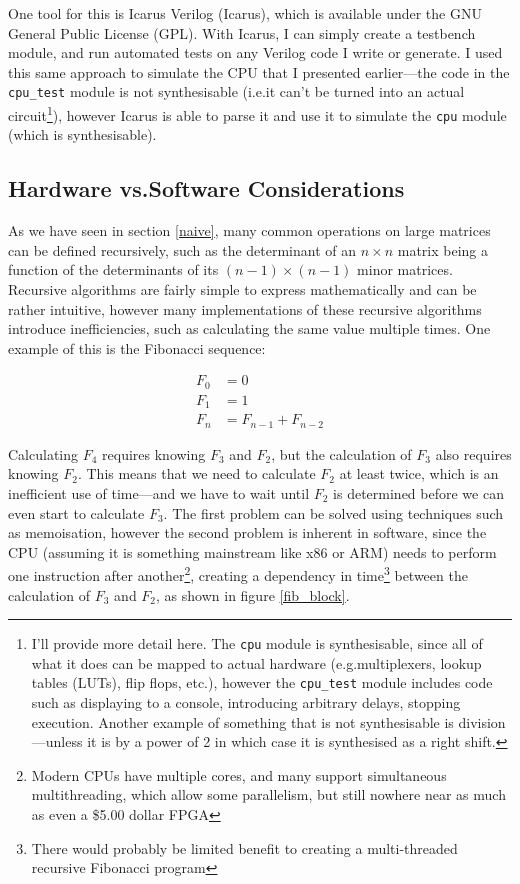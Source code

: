 \documentclass[12pt]{article}
\begin{document}
One tool for this is Icarus Verilog (Icarus), which is available under the GNU General Public License (GPL). With Icarus, I can simply create a testbench module, and run automated tests on any Verilog code I write or generate. I used this same approach to simulate the CPU that I presented earlier---the code in the \lstinline[language=Verilog]|cpu_test| module is not synthesisable (i.e.\@ it can't be turned into an actual circuit\footnote{I'll provide more detail here. The \lstinline[language=Verilog]|cpu| module is synthesisable, since all of what it does can be mapped to actual hardware (e.g.\@ multiplexers, lookup tables (LUTs), flip flops, etc.\@), however the \lstinline[language=Verilog]|cpu_test| module includes code such as displaying to a console, introducing arbitrary delays, stopping execution. Another example of something that is not synthesisable is division---unless it is by a power of 2 in which case it is synthesised as a right shift.}), however Icarus is able to parse it and use it to simulate the \lstinline[language=Verilog]|cpu| module (which is synthesisable).

\subsection{Hardware vs.\@ Software Considerations}

As we have seen in section \ref{naive}, many common operations on large matrices can be defined recursively, such as the determinant of an $n \times n$ matrix being a function of the determinants of its $(n-1) \times (n-1)$ minor matrices. Recursive algorithms are fairly simple to express mathematically and can be rather intuitive, however many implementations of these recursive algorithms introduce inefficiencies, such as calculating the same value multiple times. One example of this is the Fibonacci sequence:

\begin{align}
	F_0 &= 0 \\
	F_1 &= 1 \\
	F_n &= F_{n-1} + F_{n-2}
\end{align}

\noindent Calculating $F_4$ requires knowing $F_3$ and $F_2$, but the calculation of $F_3$ also requires knowing $F_2$. This means that we need to calculate $F_2$ at least twice, which is an inefficient use of time---and we have to wait until $F_2$ is determined before we can even start to calculate $F_3$. The first problem can be solved using techniques such as memoisation, however the second problem is inherent in software, since the CPU (assuming it is something mainstream like x86 or ARM) needs to perform one instruction after another\footnote{Modern CPUs have multiple cores, and many support simultaneous multithreading, which allow some parallelism, but still nowhere near as much as even a \$5.00 dollar FPGA}, creating a dependency in time\footnote{There would probably be limited benefit to creating a multi-threaded recursive Fibonacci program} between the calculation of $F_3$ and $F_2$, as shown in figure \ref{fib_block}.
\end{document}
